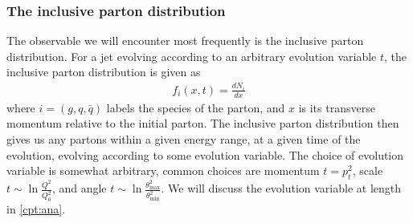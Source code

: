 \documentclass[main.tex]{subfiles}
\begin{document}
\subsubsection*{The inclusive parton distribution}
The observable we will encounter most frequently is the inclusive parton distribution. For a jet evolving according to an arbitrary evolution variable \(t\), the inclusive parton distribution is given as
\begin{align}
    f_i(x,t) = \frac{dN_i}{dx}
\end{align}
where \(i = (g,q,\bar q)\) labels the species of the parton, and \(x\) is its transverse momentum relative to the initial parton. The inclusive parton distribution then gives us any partons within a given energy range, at a given time of the evolution, evolving according to some evolution variable. The choice of evolution variable is somewhat arbitrary, common choices are momentum \(t = p_t^2\), scale \(t\sim \ln \frac{Q^2}{Q_0^2}\), and angle \(t\sim \ln \frac{\theta_{\text{max}}^2}{\theta_{\text{min}}^2}\). We will discuss the evolution variable at length in \autoref{cpt:ana}.
\end{document}
